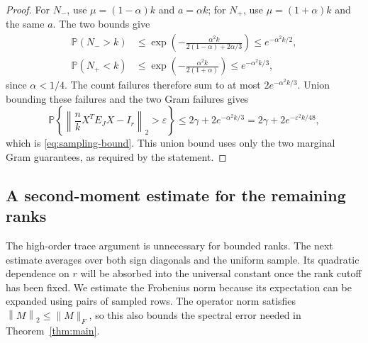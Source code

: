 \documentclass[11pt]{article}
\theoremstyle{definition}
\theoremstyle{remark}
\theoremstyle{plain}
\newcommand{\Prob}{\mathbb P}
\newcommand{\norm}[1]{\left\lVert#1\right\rVert_2}
\begin{document}
\begin{proof}
For $N_-$, use $\mu=(1-\alpha)k$ and $a=\alpha k$; for
$N_+$, use $\mu=(1+\alpha)k$ and the same $a$. The two bounds give
\[
 \begin{aligned}
 \Prob(N_->k)
   &\le\exp\left(-\frac{\alpha^2k}{2(1-\alpha)+2\alpha/3}\right)
      \le e^{-\alpha^2k/2},\\
 \Prob(N_+<k)
   &\le\exp\left(-\frac{\alpha^2k}{2(1+\alpha)}\right)
      \le e^{-\alpha^2k/3},
 \end{aligned}
\]
since $\alpha<1/4$. The count failures therefore sum to at most
$2e^{-\alpha^2k/3}$. Union bounding these failures and the two
Gram failures gives
\[
 \Prob\left\{\norm{\frac nkX^TE_JX-I_r}>\varepsilon\right\}
       \le2\gamma+2e^{-\alpha^2k/3}
       =2\gamma+2e^{-\varepsilon^2k/48},
\]
which is \eqref{eq:sampling-bound}. This union bound uses only the
two marginal Gram guarantees, as required by the statement.
\end{proof}

\subsection{A second-moment estimate for the remaining ranks}

The high-order trace argument is unnecessary for bounded ranks.
The next estimate averages over both sign diagonals and the uniform
sample. Its quadratic dependence on $r$ will be absorbed into the
universal constant once the rank cutoff has been fixed. We estimate
the   Frobenius norm because its
expectation can be expanded using pairs of sampled rows. The operator
norm satisfies $\norm{M}\le\|M\|_F$, so this also bounds the
spectral error needed in Theorem~\ref{thm:main}.
\end{document}
